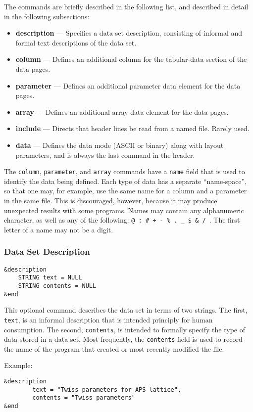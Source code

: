 \documentclass[11pt]{article}
\begin{document}
The commands are briefly described in the following list, and described in detail in the following subsections:
\begin{itemize}
\item {\bf description} --- Specifies a data set description, consisting of informal and formal text descriptions of the data set.
\item {\bf column} --- Defines an additional column for the tabular-data section of the data pages.
\item {\bf parameter} --- Defines an additional parameter data element for the data pages.
\item {\bf array} --- Defines an additional array data element for the data pages.
\item {\bf include} --- Directs that header lines be read from a named file.  Rarely used.
\item {\bf data} --- Defines the data mode (ASCII or binary) along with layout parameters, and is always the last command in the header.
\end{itemize}

The {\tt column}, {\tt parameter}, and {\tt array} commands have a {\tt name} field that is used to identify the data being defined.  Each type of data has a separate ``name-space'', so that one may, for example, use the same name for a column and a parameter in the same file.  This is discouraged, however, because it may produce unexpected results with some programs.  Names may contain any alphanumeric character, as well as any of the following: {\tt @ : \# + - \% . \_ \$ \& / }.  The first letter of a name may not be a digit.


\subsubsection{Data Set Description}
\begin{verbatim}
&description 
    STRING text = NULL
    STRING contents = NULL
&end
\end{verbatim}

This optional command describes the data set in terms of two strings.  The first, {\tt text}, is an informal description that is intended principly for human consumption.  The second, {\tt contents}, is intended to formally specify the type of data stored in a data set.  Most frequently, the {\tt contents} field is used to record the name of the program that created or most recently modified the file.

Example:
\begin{verbatim}
&description
        text = "Twiss parameters for APS lattice",
        contents = "Twiss parameters"
&end
\end{verbatim}
\end{document}
